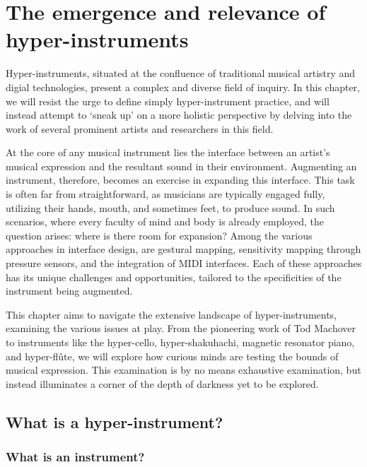 \documentclass[12pt,twoside,maitrise]{dms_ks}
\theoremstyle{definition}
\begin{document}


\chapter{The emergence and relevance of hyper-instruments}

Hyper-instruments, situated at the confluence of traditional musical artistry and digial technologies, present a complex and diverse field of inquiry.
In this chapter, we will resist the urge to define simply hyper-instrument practice, and will instead attempt to `sneak up' on a more holistic perspective by delving into the work of several prominent artists and researchers in this field.

At the core of any musical instrument lies the interface between an artist's musical expression and the resultant sound in their environment.
Augmenting an instrument, therefore, becomes an exercise in expanding this interface.
This task is often far from straightforward, as musicians are typically engaged fully, utilizing their hands, mouth, and sometimes feet, to produce sound.
In such scenarios, where every faculty of mind and body is already employed, the question arises: where is there room for expansion?
Among the various approaches in interface design, are gestural mapping, sensitivity mapping through pressure sensors, and the integration of MIDI interfaces.
Each of these approaches has its unique challenges and opportunities, tailored to the specificities of the instrument being augmented.

This chapter aims to navigate the extensive landscape of hyper-instruments, examining the various issues at play.
From the pioneering work of Tod Machover to instruments like the hyper-cello, hyper-shakuhachi, magnetic resonator piano, and hyper-flûte, we will explore how curious minds are testing the bounds of musical expression.
This examination is by no means exhaustive examination, but instead illuminates a corner of the depth of darkness yet to be explored. 

\section{What is a hyper-instrument?}

\subsection{What is an instrument?}
\end{document}
